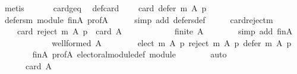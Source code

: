 \begin{isabellebody}
\ metis\isanewline
\ \ \isamarkupfalse%
\isanewline
\ \ \isamarkupfalse%
\ card{\isacharunderscore}{\kern0pt}geq{\isacharunderscore}{\kern0pt}{}\ \isamarkupfalse%
\ def{\isacharunderscore}{\kern0pt}card{\isacharunderscore}{\kern0pt}{}{\isacharcolon}{\kern0pt}\isanewline
\ \ \ \ {\isachardoublequoteopen}card\ {\isacharparenleft}{\kern0pt}defer\ m\ A\ p{\isacharparenright}{\kern0pt}\ {\isacharequal}{\kern0pt}\ {}{\isachardoublequoteclose}\isanewline
\ \ \ \ \isamarkupfalse%
\ defers{\isacharunderscore}{\kern0pt}m{\isacharunderscore}{\kern0pt}{}\ module\ fin{\isacharunderscore}{\kern0pt}A\ prof{\isacharunderscore}{\kern0pt}A\isanewline
\ \ \ \ \isamarkupfalse%
\ {\isacharparenleft}{\kern0pt}simp\ add{\isacharcolon}{\kern0pt}\ defers{\isacharunderscore}{\kern0pt}def{\isacharparenright}{\kern0pt}\isanewline
\ \ \isamarkupfalse%
\ \isamarkupfalse%
\ card{\isacharunderscore}{\kern0pt}reject{\isacharunderscore}{\kern0pt}m{\isacharcolon}{\kern0pt}\isanewline
\ \ \ \ {\isachardoublequoteopen}card\ {\isacharparenleft}{\kern0pt}reject\ m\ A\ p{\isacharparenright}{\kern0pt}\ {\isacharequal}{\kern0pt}\ card\ A\ {\isacharminus}{\kern0pt}\ {}{\isachardoublequoteclose}\isanewline
\ \ \isamarkupfalse%
\ {\isacharminus}{\kern0pt}\isanewline
\ \ \ \ \isamarkupfalse%
\ {\isachardoublequoteopen}finite\ A{\isachardoublequoteclose}\isanewline
\ \ \ \ \ \ \isamarkupfalse%
\ {\isacharparenleft}{\kern0pt}simp\ add{\isacharcolon}{\kern0pt}\ fin{\isacharunderscore}{\kern0pt}A{\isacharparenright}{\kern0pt}\isanewline
\ \ \ \ \isamarkupfalse%
\ \isamarkupfalse%
\isanewline
\ \ \ \ \ \ {\isachardoublequoteopen}well{\isacharunderscore}{\kern0pt}formed\ A\isanewline
\ \ \ \ \ \ \ \ {\isacharparenleft}{\kern0pt}elect\ m\ A\ p{\isacharcomma}{\kern0pt}\ reject\ m\ A\ p{\isacharcomma}{\kern0pt}\ defer\ m\ A\ p{\isacharparenright}{\kern0pt}{\isachardoublequoteclose}\isanewline
\ \ \ \ \ \ \isamarkupfalse%
\ fin{\isacharunderscore}{\kern0pt}A\ prof{\isacharunderscore}{\kern0pt}A\ electoral{\isacharunderscore}{\kern0pt}module{\isacharunderscore}{\kern0pt}def\ module\isanewline
\ \ \ \ \ \ \isamarkupfalse%
\ auto\isanewline
\ \ \ \ \isamarkupfalse%
\ \isamarkupfalse%
\isanewline
\ \ \ \ \ \ {\isachardoublequoteopen}card\ A\ {\isacharequal}{\kern0pt}\isanewline

\end{isabellebody}
